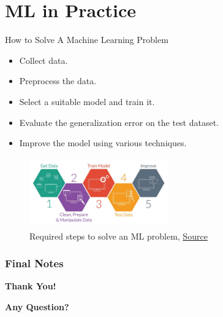 \documentclass[compress,oilve]{beamer}
\begin{document}
\section{ML in Practice}
\begin{frame}{How to Solve A Machine Learning Problem}
	\begin{itemize}
		\item Collect data.
		\item Preprocess the data.
		\item Select a suitable model and train it.
		\item Evaluate the generalization error on the test dataset.
		\item Improve the model using various techniques.
	\end{itemize}

	\begin{figure}
	 \centering
	 \includegraphics[width=6cm, height=3cm]{Figs/32.jpeg}  
	 \caption{Required steps to solve an ML problem, \href{https://tinyurl.com/2m7epjl2}{Source}}
	\end{figure}

\end{frame}


\frametitle{Final Notes}
\centering
\vspace{50 pt}
\textbf{Thank You!}
\vspace{50pt}

\textbf{Any Question?}
\end{document}

